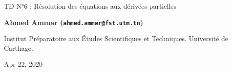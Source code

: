 \documentclass[%
oneside,                 %
final,                   %
10pt,french]{article}
\begin{document}

\newcommand{\exercisesection}[1]{\subsection*{#1}}






\thispagestyle{empty}

\begin{center}
{\LARGE\bf
\begin{spacing}{1.25}
TD N°6 : Résolution des équations aux dérivées partielles
\end{spacing}
}
\end{center}


\begin{center}
{\bf Ahmed Ammar (\texttt{ahmed.ammar@fst.utm.tn})}
\end{center}

    \begin{center}
\centerline{{\small Institut Préparatoire aux Études Scientifiques et Techniques, Université de Carthage.}}
\end{center}
    

\begin{center}
Apr 22, 2020
\end{center}

\vspace{1cm}


\tableofcontents


\vspace{1cm} %



\end{document}
